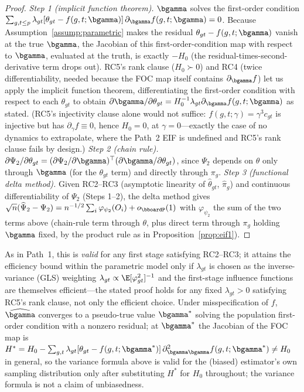 \documentclass{article}
\renewcommand{\P}{\bboardP}
\begin{document}
\begin{proof}
\emph{Step 1 (implicit function theorem).} $\bgamma$ solves the first-order condition $\sum_{g,t\leq p} \lambda_{gt}[\theta_{gt}-f(g,t;\bgamma)]\,\partial_{\bgamma} f(g,t;\bgamma) = 0$. Because Assumption~\ref{assump:parametric} makes the residual $\theta_{gt}-f(g,t;\bgamma)$ vanish at the true $\bgamma$, the Jacobian of this first-order-condition map with respect to $\bgamma$, evaluated at the truth, is exactly $-H_0$ (the residual-times-second-derivative term drops out). RC5's rank clause ($H_0\succ0$) and RC4 (twice differentiability, needed because the FOC map itself contains $\partial_{\bgamma} f$) let us apply the implicit function theorem, differentiating the first-order condition with respect to each $\theta_{gt}$ to obtain $\partial\bgamma/\partial\theta_{gt}=H_0^{-1}\lambda_{gt}\partial_{\bgamma} f(g,t;\bgamma)$ as stated. (RC5's injectivity clause alone would not suffice: $f(g,t;\gamma)=\gamma^3c_{gt}$ is injective but has $\partial_\gamma f\equiv0$, hence $H_0=0$, at $\gamma=0$---exactly the case of no dynamics to extrapolate, where the Path~2 EIF is undefined and RC5's rank clause fails by design.) \emph{Step 2 (chain rule).} $\partial\Psi_2/\partial\theta_{gt} = (\partial\Psi_2/\partial\bgamma)^\top(\partial\bgamma/\partial\theta_{gt})$, since $\Psi_2$ depends on $\theta$ only through $\bgamma$ (for the $\theta_{gt}$ term) and directly through $\pi_g$. \emph{Step 3 (functional delta method).} Given RC2--RC3 (asymptotic linearity of $\widehat\theta_{gt}$, $\widehat\pi_g$) and continuous differentiability of $\Psi_2$ (Steps 1--2), the delta method gives $\sqrt n(\widehat\Psi_2-\Psi_2) = n^{-1/2}\sum_i \varphi_{\psi_2}(O_i) + o_\P(1)$ with $\varphi_{\psi_2}$ the sum of the two terms above (chain-rule term through $\theta$, plus direct term through $\pi_g$ holding $\bgamma$ fixed, by the product rule as in Proposition~\ref{prop:eif1}).
\end{proof}

\begin{remark}
As in Path~1, this is \emph{valid} for any first stage satisfying RC2--RC3; it attains the efficiency bound within the parametric model only if $\lambda_{gt}$ is chosen as the inverse-variance (GLS) weighting $\lambda_{gt}\propto \E[\varphi_{gt}^2]^{-1}$ and the first-stage influence functions are themselves efficient---the stated proof holds for any fixed $\lambda_{gt}>0$ satisfying RC5's rank clause, not only the efficient choice. Under misspecification of $f$, $\widehat{\bgamma}$ converges to a pseudo-true value $\bgamma^*$ solving the population first-order condition with a nonzero residual; at $\bgamma^*$ the Jacobian of the FOC map is $H^* = H_0 - \sum_{g,t}\lambda_{gt}[\theta_{gt}-f(g,t;\bgamma^*)]\,\partial^2_{\bgamma\bgamma}f(g,t;\bgamma^*) \neq H_0$ in general, so the variance formula above is valid for the (biased) estimator's own sampling distribution only after substituting $H^*$ for $H_0$ throughout; the variance formula is not a claim of unbiasedness.
\end{remark}
\end{document}
